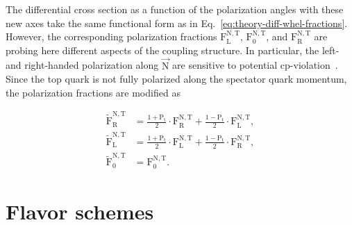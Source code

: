 
The differential cross section as a function of the polarization angles with these new axes take the same functional form as in Eq.~\ref{eq:theory-diff-whel-fractions}. However, the corresponding polarization fractions $\mathrm{F}_\mathrm{L}^\mathrm{N,T}$, $\mathrm{F}_\mathrm{0}^\mathrm{N,T}$, and $\mathrm{F}_\mathrm{R}^\mathrm{N,T}$ are probing here different aspects of the coupling structure. In particular, the left- and right-handed polarization along $\vec{\mathrm{N}}$ are sensitive to potential \gls{cp}-violation~\cite{AguilarSaavedra:2010nx}. Since the top quark is not fully polarized along the spectator quark momentum, the  polarization fractions are modified as

\begin{align}
\tilde{\mathrm{F}}_\mathrm{R}^\mathrm{N,T}&=\frac{1+\mathrm{P}_\mathrm{t}}{2}\cdot\mathrm{F}_\mathrm{R}^\mathrm{N,T}+\frac{1-\mathrm{P}_\mathrm{t}}{2}\cdot\mathrm{F}_\mathrm{L}^\mathrm{N,T}, \\
\tilde{\mathrm{F}}_\mathrm{L}^\mathrm{N,T}&=\frac{1+\mathrm{P}_\mathrm{t}}{2}\cdot\mathrm{F}_\mathrm{L}^\mathrm{N,T}+\frac{1-\mathrm{P}_\mathrm{t}}{2}\cdot\mathrm{F}_\mathrm{R}^\mathrm{N,T}, \\
\tilde{\mathrm{F}}_\mathrm{0}^\mathrm{N,T}&=\mathrm{F}_\mathrm{0}^\mathrm{N,T}.
\end{align}



\section{Flavor schemes}

